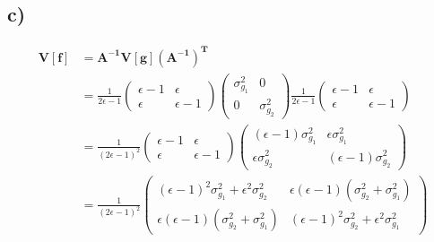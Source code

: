 \subsection*{c)}
\begin{align}
    \mathbf{V}[\mathbf{f}]
        &=  \mathbf{A^{-1}V}[\mathbf{g}]\mathbf{\left(A^{-1}\right)^T}\nonumber\\
        &=  \frac{1}{2\epsilon-1} \left(\begin{matrix}
                    \epsilon - 1 & \epsilon\\
                    \epsilon     & \epsilon - 1
                 \end{matrix}\right)
            \left(\begin{matrix}
                \sigma_{g_1}^2 & 0\\
                0 & \sigma_{g_2}^2
            \end{matrix} \right)
            \frac{1}{2\epsilon-1} \left(\begin{matrix}
                    \epsilon - 1 & \epsilon\\
                    \epsilon     & \epsilon - 1
                 \end{matrix}\right)\nonumber\\
        &=  \frac{1}{(2\epsilon-1)^2} \left(\begin{matrix}
                \epsilon -1 & \epsilon\\
                \epsilon & \epsilon -1
            \end{matrix} \right)
            \left(\begin{matrix}
                (\epsilon-1)\sigma_{g_1}^2 & \epsilon \sigma_{g_1}^2\\
                \epsilon \sigma_{g_2}^2 & (\epsilon-1)\sigma_{g_2}^2
            \end{matrix} \right)\nonumber\\
        &=  \frac{1}{(2\epsilon-1)^2} \left(\begin{matrix}
                (\epsilon-1)^2\sigma_{g_1}^2 + \epsilon^2 \sigma_{g_2}^2 & \epsilon (\epsilon-1) (\sigma_{g_2}^2+\sigma_{g_1}^2)\\
                \epsilon (\epsilon-1) (\sigma_{g_2}^2+\sigma_{g_1}^2) & (\epsilon-1)^2\sigma_{g_2}^2 + \epsilon^2 \sigma_{g_1}^2
            \end{matrix} \right)
\end{align}
